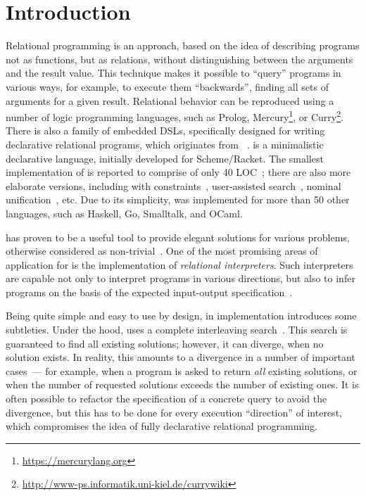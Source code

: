 \section{Introduction}

Relational programming is an approach, based on the idea of describing programs not as functions, but 
as relations, without distinguishing between the arguments and the result value. This technique makes it 
possible to ``query'' programs in various ways, for example, to execute them ``backwards'', finding
all sets of arguments for a given result. Relational behavior can be reproduced using a number of
logic programming languages, such as Prolog, Mercury\footnote{\url{https://mercurylang.org}}, 
or Curry\footnote{\url{http://www-ps.informatik.uni-kiel.de/currywiki}}. 
There is also a family of embedded DSLs, specifically designed for writing declarative relational
programs, which originates from \miniKanren~\cite{TRS}. \miniKanren is a minimalistic 
declarative language, initially developed for Scheme/Racket. The smallest implementation of \miniKanren 
is reported to comprise of only 40 LOC~\cite{MicroKanren,2016}; there are also more elaborate versions, including
\miniKanren with constraints~\cite{CKanren,CKanren1}, user-assisted search~\cite{Guided}, nominal unification~\cite{AlphaKanren},
etc. Due to its simplicity, \miniKanren was implemented for more than 50 other languages, such as
Haskell, Go, Smalltalk, and OCaml.

\miniKanren has proven to be a useful tool to provide elegant solutions for various problems, otherwise considered as
non-trivial~\cite{WillThesis}. One of the most promising areas of application for \miniKanren is the implementation of
\emph{relational interpreters}. Such interpreters are capable not only to interpret programs in various directions, but also
to infer programs on the basis of the expected input-output specification~\cite{Untagged}.

Being quite simple and easy to use by design, in implementation \miniKanren introduces some subtleties. Under the hood, \miniKanren 
uses a complete interleaving search~\cite{Search}. This search is guaranteed to find all existing solutions; however, it can diverge, when no 
solution exists. In reality, this amounts to a divergence in a number of important cases~--- for example, when a program is asked to 
return \emph{all} existing solutions, or when the number of requested solutions exceeds the number of existing ones.
It is often possible to refactor the specification of a concrete query to avoid the divergence, but this has to be done for every execution
``direction'' of interest, which compromises the idea of fully declarative relational programming.

